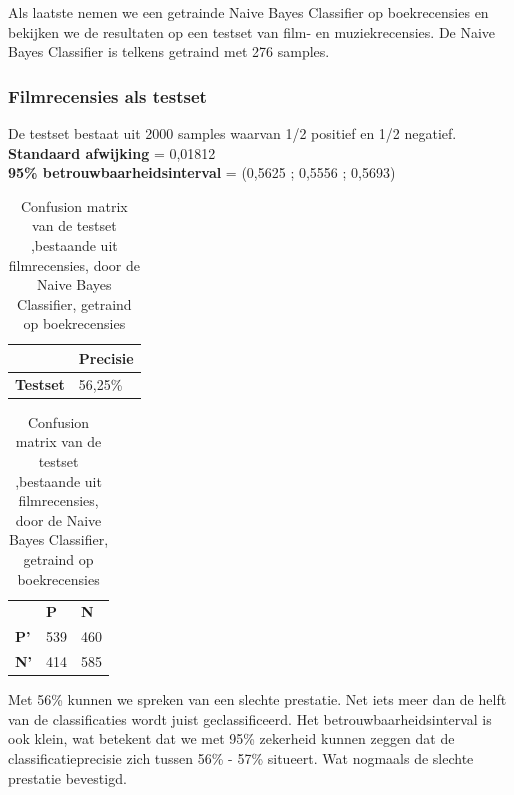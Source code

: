 \begin{appendices}
Als laatste nemen we een getrainde Naive Bayes Classifier op boekrecensies en bekijken we de resultaten op een testset van film- en muziekrecensies. De Naive Bayes Classifier is telkens getraind met 276 samples.


\subsubsection{Filmrecensies als testset}\label{Filmrecensies als testset}

De testset bestaat uit 2000 samples waarvan 1/2 positief en 1/2 negatief.\\

\textbf{Standaard afwijking} = 0,01812\\
\textbf{95\% betrouwbaarheidsinterval} = (0,5625 ; 0,5556 ; 0,5693)
 
\begin{table}[h]
\centering
\setlength\tabcolsep{4pt}
\begin{minipage}[t]{0.48\textwidth}
\centering
\begin{tabular}{l|l|}
\cline{2-2}
                                            & \textbf{Precisie} \\ \hline
\multicolumn{1}{|l|}{\textbf{Testset}}      & 56,25\%           \\ \hline
\end{tabular}
\caption{Classificatieprecisie Naive Bayes Classifier, getraind op boekrecensies, getest op filmrecensies}
\end{minipage}%
\hfill
\begin{minipage}[t]{0.48\textwidth}
\centering
\begin{tabular}{lll}
                                 & \textbf{P}               & \textbf{N}               \\ \cline{2-3} 
\multicolumn{1}{l|}{\textbf{P'}} & \multicolumn{1}{l|}{539} & \multicolumn{1}{l|}{460} \\ \cline{2-3} 
\multicolumn{1}{l|}{\textbf{N'}} & \multicolumn{1}{l|}{414} & \multicolumn{1}{l|}{585} \\ \cline{2-3} 
\end{tabular}
\caption{Confusion matrix van de testset ,bestaande uit filmrecensies, door de  Naive Bayes Classifier, getraind op boekrecensies} 
\end{minipage}
\end{table}

Met 56\% kunnen we spreken van een slechte prestatie. Net iets meer dan de helft van de classificaties wordt juist geclassificeerd. Het betrouwbaarheidsinterval is ook klein, wat betekent dat we met 95\% zekerheid kunnen zeggen dat de classificatieprecisie zich tussen 56\% - 57\% situeert. Wat nogmaals de slechte prestatie bevestigd.


\end{appendices}

